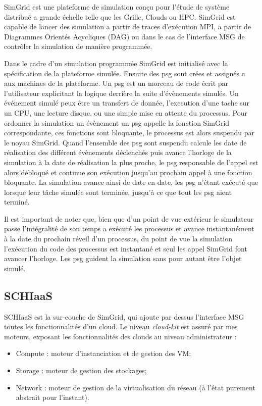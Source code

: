 \documentclass[parallelisme]{compas2017}
\begin{document}
SimGrid\cite{simgrid} est une plateforme de simulation conçu pour l'étude de système distribué
a grande échelle telle que les Grille, Clouds ou HPC. SimGrid est capable de
lancer des simulation a partir de traces d'exécution MPI, a partir de Diagrammes
Orientés Acycliques (DAG) ou dans le cas de l'interface MSG de contrôler la
simulation de manière programmée.

Dans le cadre d'un simulation programmée SimGrid est initialisé avec la
spécification de la plateforme simulée. Ensuite des \ac{psg} sont crées et
assignés a aux machines de la plateforme. Un \ac{psg} est un morceau de code
écrit par l'utilisateur explicitant la logique derrière la suite d'évènements
simulés. Un événement simulé peux être un transfert de donnée, l'execution d'une
tache sur un CPU, une lecture disque, ou une simple mise en attente du
processus. Pour ordonner la simulation un évènement un \ac{psg} appelle la
fonction SimGrid correspondante, ces fonctions sont bloquante, le processus est
alors suspendu par le noyau SimGrid. Quand l'ensemble des \ac{psg} sont
suspendu calcule les date de réalisation des différent évènements déclenchés
puis avance l'horloge de la simulation à la date de réalisation la plus proche,
le \ac{psg} responsable de l'appel est alors débloqué et continue son exécution
jusqu'au prochain appel à une fonction bloquante. La simulation avance ainsi de
date en date, les \ac{psg} n'étant exécuté que lorsque leur tâche simulée sont
terminée, jusqu'à ce que tout les \acl{psg} aient terminé.

Il est important de noter que, bien que d'un point de vue extérieur le
simulateur passe l'intégralité de son temps a exécuté les processus et avance
instantanément à la date du prochain réveil d'un processus, du point de vue la
simulation l'exécution du code des processus est instantané et seul les appel
SimGrid font avancer l'horloge. Les \acl{psg} guident la simulation sans pour
autant être l'objet simulé.

\subsection{SCHIaaS}

SCHIaaS est la sur-couche de SimGrid, qui ajoute par dessus l'interface MSG toutes les 
fonctionnalités d'un cloud. 
Le niveau \textit{cloud-kit} est assuré par mes moteurs, exposant les fonctionnalités 
des clouds au niveau administrateur :
\begin{itemize}
 \item Compute : moteur d'instanciation et de gestion des VM;
 \item Storage : moteur de gestion des stockages;
 \item Network : moteur de gestion de la virtualisation du réseau (à l'état purement abstrait pour l'instant).
\end{itemize}
\end{document}
